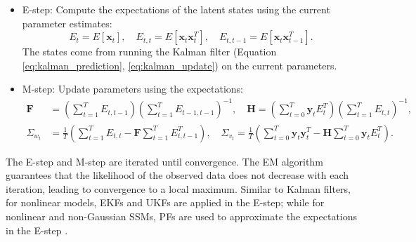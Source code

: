 \begin{itemize}
    \item E-step: Compute the expectations of the latent states using the current parameter estimates:
    \begin{equation*}
        E_t=E[\boldsymbol{x}_t],\quad E_{t,t}=E[\boldsymbol{x}_t\boldsymbol{x}_t^T],\quad E_{t,t-1}=E[\boldsymbol{x}_t\boldsymbol{x}_{t-1}^T].
    \end{equation*}
    The states come from running the Kalman filter (Equation \ref{eq:kalman_prediction}, \ref{eq:kalman_update}) on the current parameters.
    \item M-step: Update parameters using the expectations:
    \begin{subequations}
        \begin{align*}
            \boldsymbol{F}&=\left(\sum_{t=1}^{T}E_{t,t-1}\right)\left(\sum_{t=1}^{T}E_{t-1, t-1}\right)^{-1}, \quad \boldsymbol{H}=\left(\sum_{t=0}^{T}\boldsymbol{y}_tE_t^T\right)\left(\sum_{t=1}^{T}E_{t,t}\right)^{-1}, \\
            \Sigma_{w_t}&=\frac{1}{T}\left(\sum_{t=1}^{T}E_{t,t}-\boldsymbol{F}\sum_{t=1}^{T}E_{t,t-1}^T\right), \quad \Sigma_{v_t}=\frac{1}{T}\left(\sum_{t=0}^{T}\boldsymbol{y}_t\boldsymbol{y}_t^T-\boldsymbol{H}\sum_{t=0}^{T}\boldsymbol{y}_tE_t^T\right).
        \end{align*}
    \end{subequations}
\end{itemize}
The E-step and M-step are iterated until convergence. The \ac{EM} algorithm guarantees that the likelihood of the observed data does not decrease with each iteration, leading to convergence to a local maximum. Similar to Kalman filters, for nonlinear models, \acp{EKF} and \acp{UKF} are applied in the E-step; while for nonlinear and non-Gaussian \acp{SSM}, \acp{PF} are used to approximate the expectations in the E-step \citep{Durbin2000}.

